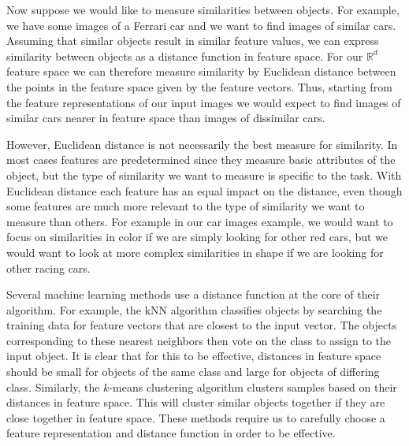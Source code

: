 Now suppose we would like to measure similarities between objects. For example, we have some images of a Ferrari car and we want to find images of similar cars. Assuming that similar objects result in similar feature values, we can express similarity between objects as a distance function in feature space. For our $\mathbb{R}^d$ feature space we can therefore measure similarity by Euclidean distance between the points in the feature space given by the feature vectors. Thus, starting from the feature representations of our input images we would expect to find images of similar cars nearer in feature space than images of dissimilar cars.

However, Euclidean distance is not necessarily the best measure for similarity. In most cases features are predetermined since they measure basic attributes of the object, but the type of similarity we want to measure is specific to the task. With Euclidean distance each feature has an equal impact on the distance, even though some features are much more relevant to the type of similarity we want to measure than others. For example in our car images example, we would want to focus on similarities in color if we are simply looking for other red cars, but we would want to look at more complex similarities in shape if we are looking for other racing cars. 

Several machine learning methods use a distance function at the core of their algorithm. For example, the \ac{kNN} algorithm classifies objects by searching the training data for feature vectors that are closest to the input vector. The objects corresponding to these nearest neighbors then vote on the class to assign to the input object. It is clear that for this to be effective, distances in feature space should be small for objects of the same class and large for objects of differing class. Similarly, the $k$-means clustering algorithm clusters samples based on their distances in feature space. This will cluster similar objects together if they are close together in feature space. These methods require us to carefully choose a feature representation and distance function in order to be effective.

